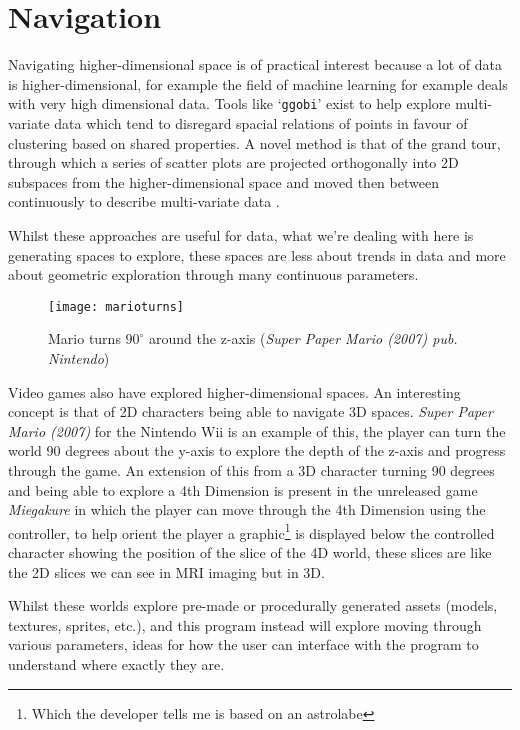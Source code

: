 \section{Navigation}
Navigating higher-dimensional space is of practical interest because a lot of
data is higher-dimensional, for example the field of machine learning for
example deals with very high dimensional data. Tools like `\verb|ggobi|' exist
to help explore multi-variate data \citep{swayne:dsc2003} which tend to
disregard spacial relations of points in favour of clustering based on shared
properties. A novel method is that of the grand tour, through which a series of
scatter plots are projected orthogonally into 2D subspaces from the
higher-dimensional space and moved then between continuously to describe
multi-variate data \citep{asimov1985grand}.

Whilst these approaches are useful for data, what we're dealing with here is
generating spaces to explore, these spaces are less about trends in data and
more about geometric exploration through many continuous parameters.

\begin{figure}[H]
    \centering
    \texttt{[image: marioturns]}
    \caption{Mario turns $90^\circ$ around the z-axis (\emph{Super Paper Mario
    (2007) pub. Nintendo})}
\end{figure}

Video games also have explored higher-dimensional spaces. An
interesting concept is that of 2D characters being able to navigate 3D spaces.
\emph{Super Paper Mario (2007)} for the Nintendo Wii is an example of this, the
player can turn the world 90 degrees about the y-axis to explore the depth of
the z-axis and progress through the game. An extension of this from a 3D
character turning 90 degrees and being able to explore a 4th Dimension is
present in the unreleased game \emph{Miegakure} in which the player can move
through the 4th Dimension using the controller, to help orient the player a
graphic\footnote{Which the developer tells me is based on an astrolabe} is
displayed below the controlled character showing the position of the slice of
the 4D world, these slices are like the 2D slices we can see in MRI imaging but
in 3D.

Whilst these worlds explore pre-made or procedurally generated assets (models,
textures, sprites, etc.), and this program instead will explore moving through
various parameters, ideas for how the user can interface with the program to
understand where exactly they are.

